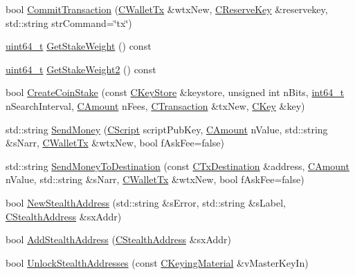 \begin{DoxyCompactItemize}
\item 
bool \hyperlink{class_c_wallet_aa13fbeaebd271f910a54cc5b82d73fde}{Commit\+Transaction} (\hyperlink{class_c_wallet_tx}{C\+Wallet\+Tx} \&wtx\+New, \hyperlink{class_c_reserve_key}{C\+Reserve\+Key} \&reservekey, std\+::string str\+Command=\char`\"{}tx\char`\"{})
\item 
\hyperlink{stdint_8h_aaa5d1cd013383c889537491c3cfd9aad}{uint64\+\_\+t} \hyperlink{class_c_wallet_a8fe028fa266ab65464992b829861a627}{Get\+Stake\+Weight} () const 
\item 
\hyperlink{stdint_8h_aaa5d1cd013383c889537491c3cfd9aad}{uint64\+\_\+t} \hyperlink{class_c_wallet_ae1f7ae1ed114ca0873ed089e163b3ba5}{Get\+Stake\+Weight2} () const 
\item 
bool \hyperlink{class_c_wallet_a644df129468440aa36f49ca3716a3c19}{Create\+Coin\+Stake} (const \hyperlink{class_c_key_store}{C\+Key\+Store} \&keystore, unsigned int n\+Bits, \hyperlink{stdint_8h_adec1df1b8b51cb32b77e5b86fff46471}{int64\+\_\+t} n\+Search\+Interval, \hyperlink{amount_8h_a4eaf3a5239714d8c45b851527f7cb564}{C\+Amount} n\+Fees, \hyperlink{class_c_transaction}{C\+Transaction} \&tx\+New, \hyperlink{class_c_key}{C\+Key} \&key)
\item 
std\+::string \hyperlink{class_c_wallet_a356d16f6df1f109674adf1d1dc577f2e}{Send\+Money} (\hyperlink{class_c_script}{C\+Script} script\+Pub\+Key, \hyperlink{amount_8h_a4eaf3a5239714d8c45b851527f7cb564}{C\+Amount} n\+Value, std\+::string \&s\+Narr, \hyperlink{class_c_wallet_tx}{C\+Wallet\+Tx} \&wtx\+New, bool f\+Ask\+Fee=false)
\item 
std\+::string \hyperlink{class_c_wallet_aad5d55fc472f6b9ccbec5af0a7246d60}{Send\+Money\+To\+Destination} (const \hyperlink{keystore_8h_a8f46ecba0ddeb036be6b58d6ed1909cd}{C\+Tx\+Destination} \&address, \hyperlink{amount_8h_a4eaf3a5239714d8c45b851527f7cb564}{C\+Amount} n\+Value, std\+::string \&s\+Narr, \hyperlink{class_c_wallet_tx}{C\+Wallet\+Tx} \&wtx\+New, bool f\+Ask\+Fee=false)
\item 
bool \hyperlink{class_c_wallet_ae3bb56ad5d165525e45e4a0c9ad034f2}{New\+Stealth\+Address} (std\+::string \&s\+Error, std\+::string \&s\+Label, \hyperlink{class_c_stealth_address}{C\+Stealth\+Address} \&sx\+Addr)
\item 
bool \hyperlink{class_c_wallet_a19d6a23e37ff619c741b7dfa9279b973}{Add\+Stealth\+Address} (\hyperlink{class_c_stealth_address}{C\+Stealth\+Address} \&sx\+Addr)
\item 
bool \hyperlink{class_c_wallet_ac45af0632ea59c56295d3158b7387f33}{Unlock\+Stealth\+Addresses} (const \hyperlink{crypter_8h_a64709c9a3acc8f5694515789a183ad7b}{C\+Keying\+Material} \&v\+Master\+Key\+In)

\end{DoxyCompactItemize}
